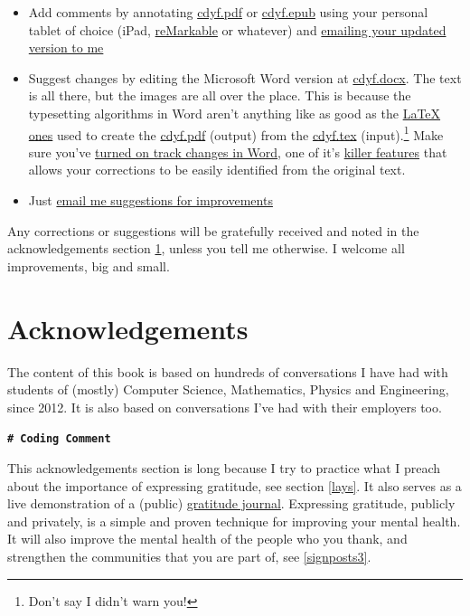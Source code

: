 \documentclass[
]{book}
\providecommand{\tightlist}{%
  \setlength{\itemsep}{0pt}\setlength{\parskip}{0pt}}
\begin{document}
\begin{itemize}
\tightlist
\item
  Add comments by annotating \href{https://www.cdyf.me/cdyf.pdf}{cdyf.pdf} or \href{https://cdyf.me/cdyf.epub}{cdyf.epub} using your personal tablet of choice (iPad, \href{https://en.wikipedia.org/wiki/ReMarkable}{reMarkable} or whatever) and \href{https://personalpages.manchester.ac.uk/staff/duncan.hull/contact}{emailing your updated version to me}
\item
  Suggest changes by editing the Microsoft Word version at \href{http://cdyf.me/cdyf.docx}{cdyf.docx}. The text is all there, but the images are all over the place. This is because the typesetting algorithms in Word aren't anything like as good as the \href{https://latex4year1.netlify.app/}{LaTeX ones} used to create the \href{https://www.cdyf.me/cdyf.pdf}{cdyf.pdf} (output) from the \href{https://github.com/dullhunk/cdyf/blob/master/_book/cdyf.tex}{cdyf.tex} (input).\footnote{Don't say I didn't warn you!} Make sure you've \href{https://support.microsoft.com/en-us/office/track-changes-in-word-197ba630-0f5f-4a8e-9a77-3712475e806a}{turned on track changes in Word}, one of it's \href{https://en.wikipedia.org/wiki/Killer_feature}{killer features} that allows your corrections to be easily identified from the original text.
\item
  Just \href{https://personalpages.manchester.ac.uk/staff/duncan.hull/contact}{email me suggestions for improvements}
\end{itemize}

Any corrections or suggestions will be gratefully received and noted in the acknowledgements section \ref{thanks}, unless you tell me otherwise. I welcome all improvements, big and small.

\hypertarget{thanks}{%
\section{Acknowledgements}\label{thanks}}

The content of this book is based on hundreds of conversations I have had with students of (mostly) Computer Science, Mathematics, Physics and Engineering, since 2012. It is also based on conversations I've had with their employers too.

\textbf{\texttt{\#\ Coding\ Comment}}

This acknowledgements section is long because I try to practice what I preach about the importance of expressing gratitude, see section \ref{lays}. It also serves as a live demonstration of a (public) \href{https://en.wikipedia.org/wiki/Gratitude_journal}{gratitude journal}. Expressing gratitude, publicly and privately, is a simple and proven technique for improving your mental health. It will also improve the mental health of the people who you thank, and strengthen the communities that you are part of, see \ref{signposts3}.
\end{document}
